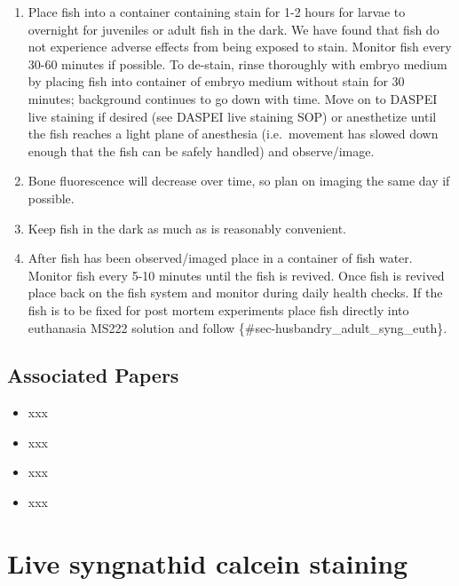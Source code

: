 \documentclass[
  letterpaper,
  DIV=11,
  numbers=noendperiod]{scrreprt}
\providecommand{\tightlist}{%
  \setlength{\itemsep}{0pt}\setlength{\parskip}{0pt}}\usepackage{longtable,booktabs,array}
\begin{document}
\begin{enumerate}
\def\labelenumi{\arabic{enumi}.}
\tightlist
\item
  Place fish into a container containing stain for 1-2 hours for larvae
  to overnight for juveniles or adult fish in the dark. We have found
  that fish do not experience adverse effects from being exposed to
  stain. Monitor fish every 30-60 minutes if possible. To de-stain,
  rinse thoroughly with embryo medium by placing fish into container of
  embryo medium without stain for 30 minutes; background continues to go
  down with time. Move on to DASPEI live staining if desired (see DASPEI
  live staining SOP) or anesthetize until the fish reaches a light plane
  of anesthesia (i.e.~movement has slowed down enough that the fish can
  be safely handled) and observe/image.
\item
  Bone fluorescence will decrease over time, so plan on imaging the same
  day if possible.
\item
  Keep fish in the dark as much as is reasonably convenient.
\item
  After fish has been observed/imaged place in a container of fish
  water. Monitor fish every 5-10 minutes until the fish is revived. Once
  fish is revived place back on the fish system and monitor during daily
  health checks. If the fish is to be fixed for post mortem experiments
  place fish directly into euthanasia MS222 solution and follow
  \{\#sec-husbandry\_adult\_syng\_euth\}.
\end{enumerate}

\hypertarget{associated-papers-55}{%
\section{Associated Papers}\label{associated-papers-55}}

\begin{itemize}
\tightlist
\item
  xxx
\item
  xxx
\item
  xxx
\item
  xxx
\end{itemize}

\hypertarget{sec-vert_exp-live_calcein_syngnathid}{%
\chapter{Live syngnathid calcein
staining}\label{sec-vert_exp-live_calcein_syngnathid}}
\end{document}
